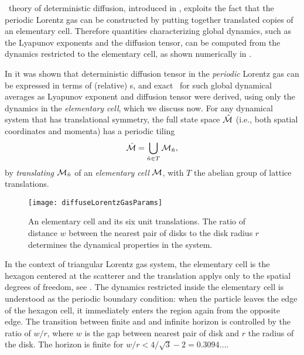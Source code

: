 

\Po\ theory of deterministic diffusion, introduced in
, exploits the fact that the periodic
Lorentz gas can be constructed by putting together translated copies
of an elementary cell.  Therefore quantities characterizing global
dynamics, such as the Lyapunov exponents and the diffusion tensor, can
be computed from the dynamics restricted to the elementary cell, as
shown numerically in .

In  it was shown
that deterministic diffusion tensor in the {\em periodic} Lorentz gas
can be expressed in terms of (relative) \po s, and exact \cycForm\ for
such global dynamical averages as Lyapunov exponent and diffusion
tensor were derived, using only the dynamics in the \emph{elementary
cell}, which we discuss now. For any dynamical system that has
translational symmetry, the full state space $\hat {{\cal M}}$ (i.e., both spatial
coordinates and momenta) has a periodic tiling
\[ %
\hM=\bigcup_{ \hn \in T} \pS_{\hn},
\] %
by {\em translating} ${\cal M}_{\hat{n}}$ of an {\em elementary cell} ${\cal M}$,
with $T$ the abelian group of lattice translations.

\begin{figure}[htbp]
	\begin{center}
    \texttt{[image: diffuseLorentzGasParams]}
	\end{center}
	\caption[]{\label{fig-LorentzGasParams}
        An elementary cell and its six unit translations. The ratio of
        distance $w$ between the nearest pair of disks to the    disk
        radius $r$ determines the dynamical properties in the system.
	}
\end{figure}

In the context of triangular Lorentz gas system, the elementary cell
is the hexagon centered at the scatterer and the translation applys
only to the spatial degrees of freedom, see
. The dynamics restricted inside the
elementary cell is understood as the periodic boundary condition: when
the particle leaves the edge of the hexagon cell, it immediately
enters the region again from the opposite edge. The transition between
finite and and infinite horizon is controlled by the ratio of $w/r$,
where $w$ is the gap between nearest pair of disk and $r$ the radius
of the disk. The horizon is finite for $w/r < 4/\sqrt{3}-2 =
0.3094\dots$.

